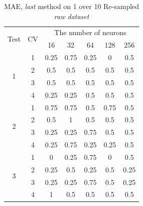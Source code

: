 \documentclass[draft,dvipsnames]{drexel-thesis}
\begin{document}
\begin{thesis}
\begin{table}[!t]
\centering
\caption{MAE, {\em last} method on 1 over 10 Re-sampled {\em raw dataset}}
\label{tbl:mae_last_1_10}
\begin{tabular}{|c|c|c|c|c|c|c|}
\hline
\multirow{2}{*}{Test} & \multirow{2}{*}{CV} & \multicolumn{5}{c|}{The number of neurons}                               \\ \cline{3-7}
                      &                     & 16           & 32           & 64           & 128          & 256          \\ \hline
\multirow{4}{*}{1}    & 1                   & 0.25         & 0.75         & 0.25         & 0            & 0.5          \\ \cline{2-7}
                      & 2                   & 0.5          & 0.5          & 0.5          & 0.5          & 0.5          \\ \cline{2-7}
                      & 3                   & 0.5          & 0.5          & 0.5          & 0.5          & 0.5          \\ \cline{2-7}
                      & 4                   & 0.25         & 0.25         & 0.5          & 0.5          & 0.5          \\ \hline
\multirow{4}{*}{2}    & 1                   & 0.75         & 0.75         & 0.5          & 0.75         & 0.5          \\ \cline{2-7}
                      & 2                   & 0.5          & 1            & 0.5          & 0.5          & 0.5          \\ \cline{2-7}
                      & 3                   & 0.25         & 0.25         & 0.75         & 0.5          & 0.5          \\ \cline{2-7}
                      & 4                   & 0.25         & 0.75         & 0.25         & 0.25         & 0.5          \\ \hline
\multirow{4}{*}{3}    & 1                   & 0            & 0.25         & 0.75         & 0            & 0.5          \\ \cline{2-7}
                      & 2                   & 0.25         & 0.5          & 0.25         & 0.5          & 0.25         \\ \cline{2-7}
                      & 3                   & 0.25         & 0.25         & 0.75         & 0.5          & 0.25         \\ \cline{2-7}
                      & 4                   & 1            & 0.5          & 0.5          & 0.5          & 0.5          \\ \hline

\end{tabular}
\end{table}
\end{thesis}
\end{document}
